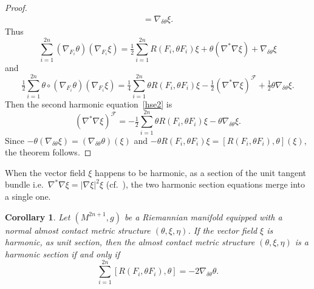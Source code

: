 \documentclass[a4paper,reqno]{amsart}
\newtheorem{corollary}[thm]{Corollary}
\theoremstyle{definition}
\theoremstyle{remark}
\theoremstyle{plain}
\numberwithin{equation}{section}
\begin{document}
\begin{proof}
\begin{align*}
=\nabla_{\delta \theta} \xi .
\end{align*}
Thus
$$
\sum_{i=1}^{2n}(\nabla_{F_i} \theta) ( \nabla_{F_i} \xi) = \tfrac{1}{2}\sum_{i=1}^{2n}R(F_i,\theta F_i)\xi  +\theta (\nabla^* \nabla \xi) + \nabla_{\delta \theta} \xi
$$
and
$$\tfrac{1}{2}\sum_{i=1}^{2n}\theta \circ (\nabla_{F_i} \theta)
  (\nabla_{F_i} \xi)  = \tfrac{1}{4}\sum_{i=1}^{2n}\theta R(F_i,\theta F_i)\xi
-\tfrac{1}{2} (\nabla^* \nabla \xi)^{\mathcal{F}} +
\tfrac{1}{2}\theta \nabla_{\delta \theta} \xi.
$$
Then the second harmonic equation~\eqref{hse2} is
$$
(\nabla^* \nabla \xi)^{\mathcal{F}} =
-\tfrac{1}{2}\sum_{i=1}^{2n}\theta R(F_i,\theta F_i)\xi -\theta
\nabla_{\delta \theta } \xi.
$$
Since $-\theta (\nabla_{\delta \theta} \xi) = (\nabla_{\delta \theta}
\theta) (\xi)$ and
$-\theta R(F_i,\theta F_i)\xi = [R(F_i,\theta F_i), \theta ]
(\xi)$, the theorem follows.
\end{proof}


When the vector field $\xi$ happens to be harmonic, as a section
of the unit tangent bundle i.e.~$\nabla^{*}\nabla \xi = |\nabla\xi|^2\xi$ (cf.~\cite{Perrone}),
the two harmonic section equations merge into a single one.

\begin{corollary}\label{corollary3.1}
  Let $(M^{2n+1},g)$ be a Riemannian manifold equipped with a
  normal almost contact metric structure $(\theta,\xi,\eta)$. If
  the vector field $\xi$ is harmonic, as unit section, then the
  almost contact metric structure $(\theta,\xi,\eta)$ is a harmonic
  section if and only if
  $$
  \sum_{i=1}^{2n}[R(F_i,\theta  F_i),\theta ] =-2\nabla_{\delta
    \theta} \theta .
  $$
\end{corollary}
\end{document}
